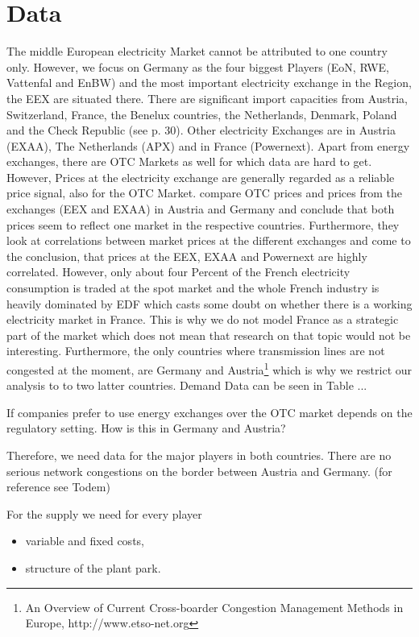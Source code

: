 \section{Data}

The middle European electricity Market cannot be attributed to one country only. However, we focus on Germany as the four biggest Players (EoN, RWE, Vattenfal and EnBW) and the most important electricity exchange in the Region, the EEX are situated there. There are significant import capacities from Austria, Switzerland, France, the Benelux countries, the Netherlands, Denmark, Poland and the Check Republic (see p. 30). Other electricity Exchanges are in Austria (EXAA), The Netherlands (APX) and in France (Powernext). Apart from energy exchanges, there are OTC Markets as well for which data are hard to get. However, Prices at the electricity exchange are generally regarded as a reliable price signal, also for the OTC Market. \cite{Holler2006} compare OTC prices and prices from the exchanges (EEX and EXAA) in Austria and Germany and conclude that both prices seem to reflect one market in the respective countries. Furthermore, they look at correlations between market prices at the different exchanges and come to the conclusion, that prices at the EEX, EXAA and Powernext are highly correlated. However, only about four Percent of the French electricity consumption is traded at the spot market and the whole French industry is heavily dominated by EDF which casts some doubt on whether there is a working electricity market in France. This is why we do not model France as a strategic part of the market which does not mean that research on that topic would not be interesting. Furthermore, the only countries where transmission lines are not congested at the moment, are Germany and Austria\footnote{An Overview of Current Cross-boarder Congestion Management Methods in Europe, http://www.etso-net.org} which is why we restrict our analysis to to two latter countries. 
Demand Data can be seen in Table ...

If companies prefer to use energy exchanges over the OTC market depends on the regulatory setting. How is this in Germany and Austria?

Therefore, we need data for the major players in both countries. There are no serious network congestions on the border between Austria and Germany. (for reference see Todem)

For the supply we need for every player

\begin{itemize}
\item variable and fixed costs,
\item structure of the plant park.
\end{itemize}

